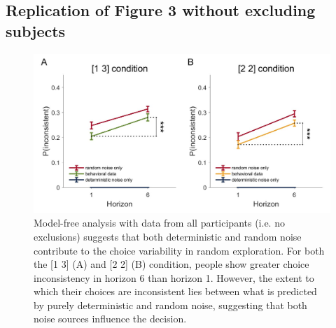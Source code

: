 \documentclass[12pt]{article}
\begin{document}
	\subsection{Replication of Figure 3 without excluding subjects}
	\begin{figure}[H]
		\begin{center}
			\includegraphics[width=\textwidth]{figures/RanDetNoise_pinconsistent__all.jpg}
			\caption{Model-free analysis with data from all participants (i.e. no exclusions) suggests that both deterministic and random noise contribute to the choice variability in random exploration. For both the [1 3] (A) and [2 2] (B) condition, people show greater choice inconsistency in horizon 6 than horizon 1. However, the extent to which their choices are inconsistent lies between what is predicted by purely deterministic and random noise, suggesting that both noise sources influence the decision.}
			\label{fig:s2}
		\end{center}
	\end{figure}

	\newpage
\end{document}
